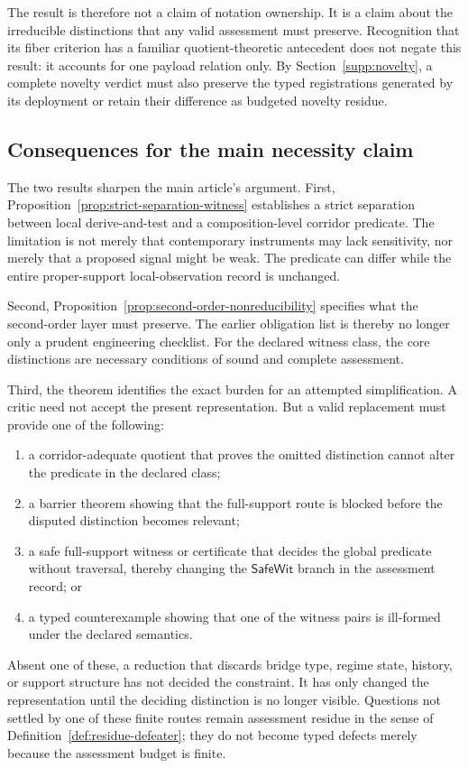 \documentclass[11pt]{article}
\theoremstyle{definition}
\begin{document}
The result is therefore not a claim of notation ownership. It is a claim about
the irreducible distinctions that any valid assessment must preserve. Recognition
that its fiber criterion has a familiar quotient-theoretic antecedent does not
negate this result: it accounts for one payload relation only. By
Section~\ref{supp:novelty}, a complete novelty verdict must also preserve the
typed registrations generated by its deployment or retain their difference as
budgeted novelty residue.

\subsection{Consequences for the main necessity claim}
\label{supp:consequences}

The two results sharpen the main article's argument. First,
Proposition~\ref{prop:strict-separation-witness} establishes a strict separation
between local derive-and-test and a composition-level corridor predicate. The
limitation is not merely that contemporary instruments may lack sensitivity, nor
merely that a proposed signal might be weak. The predicate can differ while the
entire proper-support local-observation record is unchanged.

Second, Proposition~\ref{prop:second-order-nonreducibility} specifies what the
second-order layer must preserve. The earlier obligation list is thereby no longer
only a prudent engineering checklist. For the declared witness class, the core
distinctions are necessary conditions of sound and complete assessment.

Third, the theorem identifies the exact burden for an attempted simplification. A
critic need not accept the present representation. But a valid replacement must
provide one of the following:
\begin{enumerate}
\item a corridor-adequate quotient that proves the omitted distinction cannot
alter the predicate in the declared class;

\item a barrier theorem showing that the full-support route is blocked before
the disputed distinction becomes relevant;

\item a safe full-support witness or certificate that decides the global
predicate without traversal, thereby changing the $\mathsf{SafeWit}$ branch in the assessment record; or

\item a typed counterexample showing that one of the witness pairs is ill-formed
under the declared semantics.
\end{enumerate}
Absent one of these, a reduction that discards bridge type, regime state, history,
or support structure has not decided the constraint. It has only changed the
representation until the deciding distinction is no longer visible. Questions not
settled by one of these finite routes remain assessment residue in the sense of
Definition~\ref{def:residue-defeater}; they do not become typed defects merely
because the assessment budget is finite.
\end{document}
